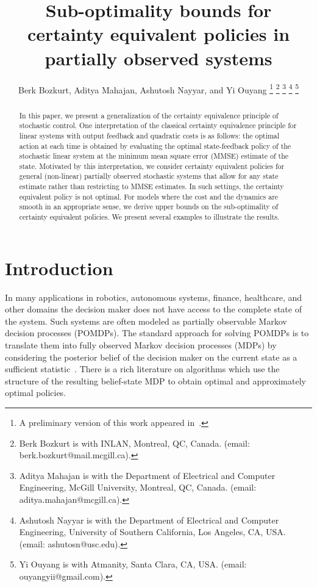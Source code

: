 \documentclass[letterpaper, 10pt]{IEEEtran}
\theoremstyle{plain}
\theoremstyle{nonumberplain}
\theoremstyle{plain}
\begin{document}
\title{Sub-optimality bounds for certainty equivalent policies in partially observed systems}
\author{Berk Bozkurt, Aditya Mahajan, Ashutosh Nayyar, and Yi Ouyang%
\thanks{A preliminary version of this work appeared in~\cite{bozkurtgeneralized}.}
\thanks{Berk Bozkurt is with INLAN, Montreal, QC, Canada. (email: berk.bozkurt@mail.mcgill.ca).} 
\thanks{Aditya Mahajan is with the Department of Electrical and Computer Engineering, McGill University, Montreal, QC, Canada. (email: aditya.mahajan@mcgill.ca).}%
\thanks{Ashutosh Nayyar is with the Department of Electrical and Computer Engineering, University of Southern California, Los Angeles, CA, USA. (email: ashutosn@usc.edu).}%
\thanks{Yi Ouyang is with Atmanity, Santa Clara, CA, USA. (email: ouyangyii@gmail.com).}}
\maketitle 

\begin{abstract}
    In this paper, we present a generalization of the certainty equivalence principle of stochastic control. One interpretation of the classical certainty equivalence principle for linear systems with output feedback and quadratic costs is as follows: the optimal action at each time is obtained by evaluating the optimal state-feedback policy of the stochastic linear system at the minimum mean square error (MMSE) estimate of the state. Motivated by this interpretation, we consider certainty equivalent policies for general (non-linear) partially observed stochastic systems that allow for any state estimate rather than restricting to MMSE estimates. In such settings, the certainty equivalent policy is not optimal. For models where the cost and the dynamics are smooth in an appropriate sense, we derive upper bounds on the sub-optimality of certainty equivalent policies. We present several examples to illustrate the results.
\end{abstract}

\section{Introduction}
In many applications in robotics, autonomous systems, finance, healthcare, and other domains the decision maker does not have access to the complete state of the system. Such systems are often modeled as partially observable Markov decision processes (POMDPs). The standard approach for solving POMDPs is to translate them into fully observed Markov decision processes (MDPs) by considering the posterior belief of the decision maker on the current state as a sufficient statistic~\cite{Astrom1965,Smallwood1973}. There is a rich literature on algorithms which use the structure of the resulting belief-state MDP to obtain optimal and approximately optimal policies.
\end{document}

